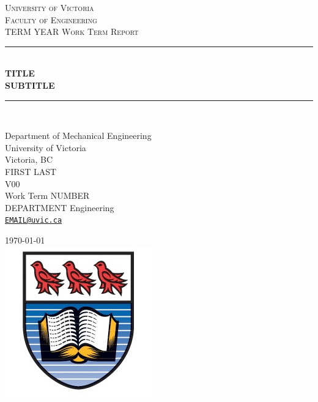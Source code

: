 \documentclass[12pt]{article}
\newcommand{\email}[1]{\href{mailto:#1}{\texttt{#1}}}
\begin{document}


\begin{titlepage}
\newcommand{\HRule}{\rule{\linewidth}{0.5mm}} 
\center 

\textsc{\LARGE University of Victoria}\\[0.25cm]
\textsc{\Large Faculty of Engineering}\\[0.5cm]
\textsc{\large TERM YEAR Work Term Report}\\[0.5cm] %

\HRule \\[0.4cm]
{ \huge \bfseries TITLE}\\ [0.1cm]%
{ \Large \bfseries SUBTITLE}
\HRule \\[1 cm]
 
\begin{center}\large
Department of Mechanical Engineering\\
University of Victoria\\
Victoria, BC\\[0.5cm]

FIRST \textsc{LAST}	\\ %
V00	\\
Work Term NUMBER	\\
DEPARTMENT Engineering\\
\email{EMAIL@uvic.ca}\\[1cm]
\end{center}


{\large \today}\\[0.5cm] %

\includegraphics{UVic_logo}\\[0.5cm]


\end{titlepage}
\end{document}
